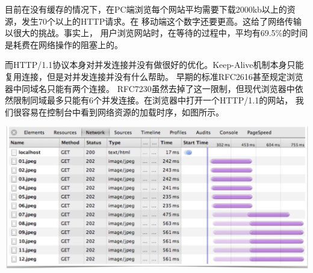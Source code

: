 \documentclass[twoside]{CUGThesis}
\begin{document}
	目前在没有缓存的情况下，在PC端浏览每个网站平均需要下载2000kb以上的资源，发生70个以上的HTTP请求。在
	移动端这个数字还要更高。这给了网络传输以很大的挑战。事实上，
	用户浏览网站时，在等待的过程中，平均有69.5\%的时间是耗费在网络操作的阻塞上的。\par 
	而HTTP/1.1协议本身对并发连接并没有做很好的优化。Keep-Alive机制本身只能复用连接，但是对并发连接并没有什么帮助。
	早期的标准RFC2616甚至规定浏览器中同域名只能有两个连接\cite{fielding2006hypertext}。
	RFC7230虽然去掉了这一限制，但现代浏览器中依然限制同域最多只能有6个并发连接。在浏览器中打开一个HTTP/1.1的网站，
	我们很容易在控制台中看到网络资源的加载时序，如图所示。\\ \par 
	\includegraphics[scale=0.2]{Figures/web_load.jpg}
\end{document}
